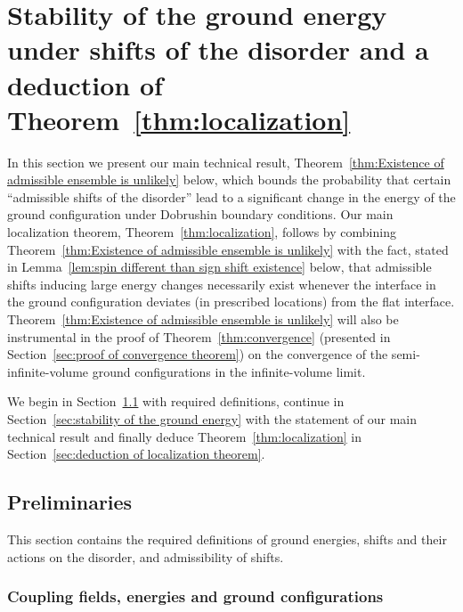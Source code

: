 \documentclass[11pt, reqno]{amsart}
\numberwithin{equation}{section}
\begin{document}
\section{Stability of the ground energy under shifts of the disorder and a deduction of Theorem~\ref{thm:localization}}
\label{sec:4}

In this section we present our main technical result, Theorem~\ref{thm:Existence of admissible ensemble is unlikely} below, which bounds the probability that certain ``admissible shifts of the disorder'' lead to a significant change in the energy of the ground configuration under Dobrushin boundary conditions. Our main localization theorem, Theorem~\ref{thm:localization}, follows by combining Theorem~\ref{thm:Existence of admissible ensemble is unlikely} with the fact, stated in Lemma~\ref{lem:spin different than sign shift existence} below,
that admissible shifts inducing large energy changes necessarily exist whenever the interface in the ground configuration deviates (in prescribed locations) from the flat interface. Theorem~\ref{thm:Existence of admissible ensemble is unlikely} will also be instrumental in the proof of Theorem~\ref{thm:convergence} 
(presented in Section~\ref{sec:proof of convergence theorem})
on the convergence of the semi-infinite-volume ground configurations in the infinite-volume limit.

We begin in Section~\ref{sec:shift preliminaries} with required definitions, continue in Section~\ref{sec:stability of the ground energy} with the statement of our main technical result and finally deduce Theorem~\ref{thm:localization} in Section~\ref{sec:deduction of localization theorem}.

\subsection{Preliminaries} 
\label{sec:shift preliminaries}

This section contains the required definitions of ground energies, shifts and their actions on the disorder, and admissibility of shifts. 

\subsubsection{Coupling fields, energies and ground configurations}\label{sec:disorders energies and ground configurations}

\mbox{}

\smallskip
\end{document}

